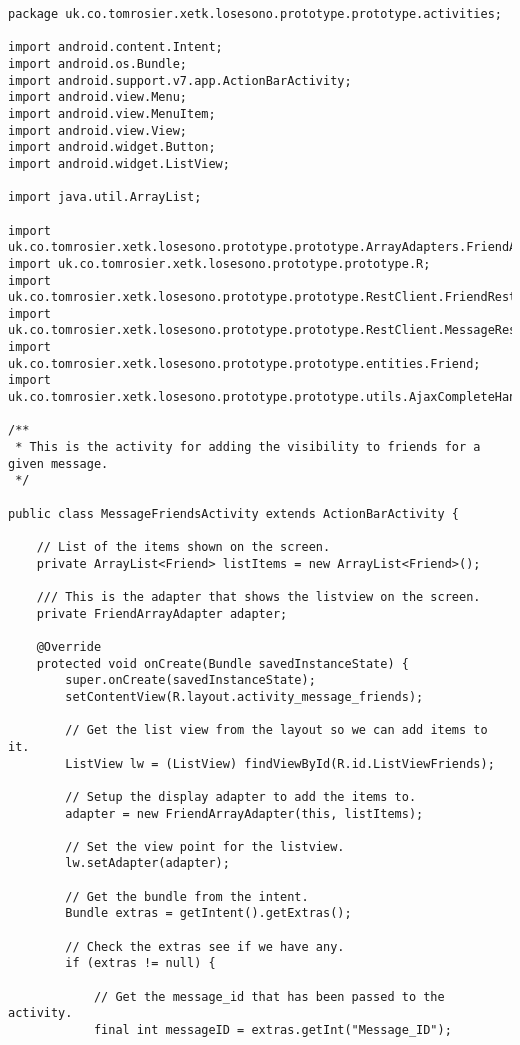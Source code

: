 \begin{lstlisting}
package uk.co.tomrosier.xetk.losesono.prototype.prototype.activities;

import android.content.Intent;
import android.os.Bundle;
import android.support.v7.app.ActionBarActivity;
import android.view.Menu;
import android.view.MenuItem;
import android.view.View;
import android.widget.Button;
import android.widget.ListView;

import java.util.ArrayList;

import uk.co.tomrosier.xetk.losesono.prototype.prototype.ArrayAdapters.FriendArrayAdapter;
import uk.co.tomrosier.xetk.losesono.prototype.prototype.R;
import uk.co.tomrosier.xetk.losesono.prototype.prototype.RestClient.FriendRestClient;
import uk.co.tomrosier.xetk.losesono.prototype.prototype.RestClient.MessageRestClient;
import uk.co.tomrosier.xetk.losesono.prototype.prototype.entities.Friend;
import uk.co.tomrosier.xetk.losesono.prototype.prototype.utils.AjaxCompleteHandler;

/**
 * This is the activity for adding the visibility to friends for a given message.
 */

public class MessageFriendsActivity extends ActionBarActivity {

    // List of the items shown on the screen.
    private ArrayList<Friend> listItems = new ArrayList<Friend>();

    /// This is the adapter that shows the listview on the screen.
    private FriendArrayAdapter adapter;

    @Override
    protected void onCreate(Bundle savedInstanceState) {
        super.onCreate(savedInstanceState);
        setContentView(R.layout.activity_message_friends);

        // Get the list view from the layout so we can add items to it.
        ListView lw = (ListView) findViewById(R.id.ListViewFriends);

        // Setup the display adapter to add the items to.
        adapter = new FriendArrayAdapter(this, listItems);

        // Set the view point for the listview.
        lw.setAdapter(adapter);

        // Get the bundle from the intent.
        Bundle extras = getIntent().getExtras();

        // Check the extras see if we have any.
        if (extras != null) {

            // Get the message_id that has been passed to the activity.
            final int messageID = extras.getInt("Message_ID");


\end{lstlisting}
